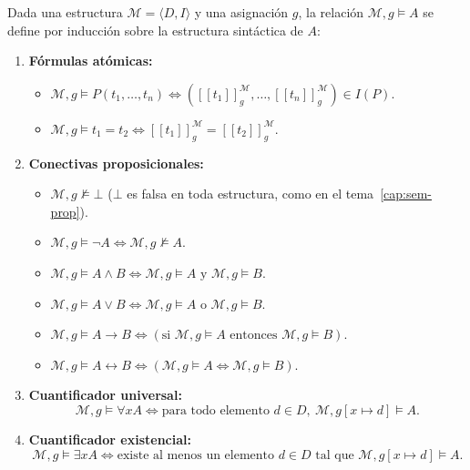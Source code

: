 \begin{definition}
Dada una estructura $\mathcal{M} = \langle D, I \rangle$ y una asignación $g$, la relación $\mathcal{M}, g \models A$ se define por inducción sobre la estructura sintáctica de $A$:
\begin{enumerate}
    \item \textbf{Fórmulas atómicas:}
    \begin{itemize}
        \item $\mathcal{M}, g \models P(t_1, \dots, t_n) \iff ([\![t_1]\!]^\mathcal{M}_g, \dots, [\![t_n]\!]^\mathcal{M}_g) \in I(P)$.
        \item $\mathcal{M}, g \models t_1 = t_2 \iff [\![t_1]\!]^\mathcal{M}_g = [\![t_2]\!]^\mathcal{M}_g$.
    \end{itemize}
    \item \textbf{Conectivas proposicionales:}
    \begin{itemize}
        \item $\mathcal{M}, g \not\models \bot$ ($\bot$ es falsa en toda estructura, como en el tema~\ref{cap:sem-prop}).
        \item $\mathcal{M}, g \models \neg A \iff \mathcal{M}, g \not\models A$.
        \item $\mathcal{M}, g \models A \land B \iff \mathcal{M}, g \models A \text{ y } \mathcal{M}, g \models B$.
        \item $\mathcal{M}, g \models A \lor B \iff \mathcal{M}, g \models A \text{ o } \mathcal{M}, g \models B$.
        \item $\mathcal{M}, g \models A \to B \iff (\text{si } \mathcal{M}, g \models A \text{ entonces } \mathcal{M}, g \models B)$.
        \item $\mathcal{M}, g \models A \leftrightarrow B \iff (\mathcal{M}, g \models A \iff \mathcal{M}, g \models B)$.
    \end{itemize}
    \item \textbf{Cuantificador universal:}
    \[
    \mathcal{M}, g \models \forall x A \iff \text{para todo elemento } d \in D, \ \mathcal{M}, g[x \mapsto d] \models A.
    \]
    \item \textbf{Cuantificador existencial:}
    \[
    \mathcal{M}, g \models \exists x A \iff \text{existe al menos un elemento } d \in D \text{ tal que } \mathcal{M}, g[x \mapsto d] \models A.
    \]
\end{enumerate}
\end{definition}

